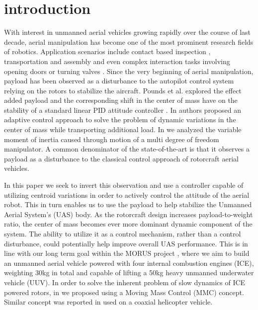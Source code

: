 \section{introduction}
With interest in unmanned aerial vehicles growing rapidly over the course of last decade, aerial manipulation has become one of the most prominent research fields of robotics. Application scenarios include contact based inspection \cite{Alexis2016}, transportation and assembly \cite{Jimenez-Cano2013} and even complex interaction tasks involving opening doors \cite{Tsukagoshi2015} or turning valves \cite{Korpela2014a}. Since the very beginning of aerial manipulation, payload has been observed as a disturbance to the autopilot control system relying on the rotors to stabilize the aircraft. Pounds et al. explored the effect added payload and the corresponding shift in the center of mass have on the stability of a standard linear PID attitude controller \cite{Pounds2012}. In \cite{PalunkoIFAC2011} authors proposed an adaptive control approach to solve the problem of dynamic variations in the center of mass while transporting additional load. In \cite {Korpela2012} we analyzed the variable moment of inertia caused through motion of a multi degree of freedom manipulator. A common denominator of the state-of-the-art is that it observes a payload as a disturbance to the classical control approach of rotorcraft aerial vehicles. 


In this paper we seek to invert this observation and use a controller capable of utilizing centroid variations in order to actively control the attitude of the aerial robot. This in turn enables us to use the payload to help stabilize the Unmanned Aerial System's (UAS) body. As the rotorcraft design increases payload-to-weight ratio, the center of mass becomes ever more dominant dynamic component of the system. The ability to utilize it as a control mechanism, rather than a control disturbance, could potentially help improve overall UAS performance. This is in line with our long term goal within the MORUS project \cite{MORUSweb}, where we aim to build an unmanned aerial vehicle powered with four internal combustion engines (ICE), weighting 30kg in total and capable of lifting a 50kg heavy unmanned underwater vehicle (UUV). In order to solve the inherent problem of slow dynamics of ICE powered rotors, in \cite{Haus2017} we proposed using a Moving Mass Control (MMC) concept. Similar concept was reported in \cite{bermes2008new} used on a coaxial helicopter vehicle.

